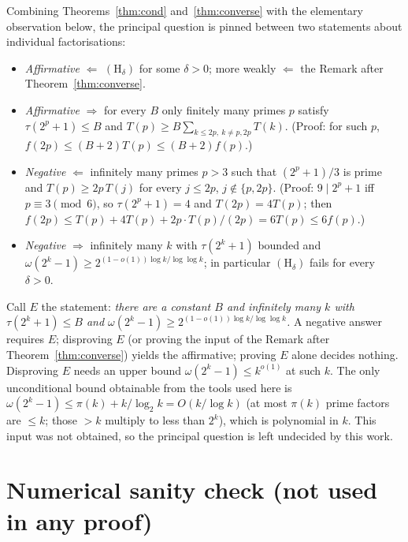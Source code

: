 \documentclass[11pt]{article}
\theoremstyle{remark}
\begin{document}
Combining Theorems~\ref{thm:cond} and~\ref{thm:converse} with the elementary observation
below, the principal question is pinned between two statements about individual factorisations:

\begin{itemize}
\item \emph{Affirmative} $\Leftarrow$ $(\mathrm H_\delta)$ for some $\delta>0$; more weakly
  $\Leftarrow$ the Remark after Theorem~\ref{thm:converse}.
\item \emph{Affirmative} $\Rightarrow$ for every $B$ only finitely many primes $p$ satisfy
  $\tau(2^p+1)\le B$ and $T(p)\ge B\sum_{k\le2p,\ k\ne p,2p}T(k)$.
  (Proof: for such $p$, $f(2p)\le(B+2)T(p)\le(B+2)f(p)$.)
\item \emph{Negative} $\Leftarrow$ infinitely many primes $p>3$ such that $(2^p+1)/3$ is prime and
  $T(p)\ge2p\,T(j)$ for every $j\le2p$, $j\notin\{p,2p\}$. (Proof: $9\mid2^p+1$ iff $p\equiv3\pmod6$,
  so $\tau(2^p+1)=4$ and $T(2p)=4T(p)$; then $f(2p)\le T(p)+4T(p)+2p\cdot T(p)/(2p)=6T(p)\le6f(p)$.)
\item \emph{Negative} $\Rightarrow$ infinitely many $k$ with $\tau(2^k+1)$ bounded and
  $\omega(2^k-1)\ge2^{(1-o(1))\log k/\log\log k}$; in particular $(\mathrm H_\delta)$ fails for
  every $\delta>0$.
\end{itemize}

Call $E$ the statement: \emph{there are a constant $B$ and infinitely many $k$ with
$\tau(2^k+1)\le B$ and $\omega(2^k-1)\ge2^{(1-o(1))\log k/\log\log k}$.} A negative answer requires
$E$; disproving $E$ (or proving the input of the Remark after Theorem~\ref{thm:converse}) yields
the affirmative; proving $E$ alone decides nothing. Disproving $E$ needs an upper bound
$\omega(2^k-1)\le k^{o(1)}$ at such $k$. The only unconditional bound obtainable from the tools
used here is $\omega(2^k-1)\le\pi(k)+k/\log_2k=O(k/\log k)$ (at most $\pi(k)$ prime factors are
$\le k$; those $>k$ multiply to less than $2^k$), which is polynomial in $k$. This input was not
obtained, so the principal question is left undecided by this work.

\appendix
\section{Numerical sanity check (not used in any proof)}
\end{document}
